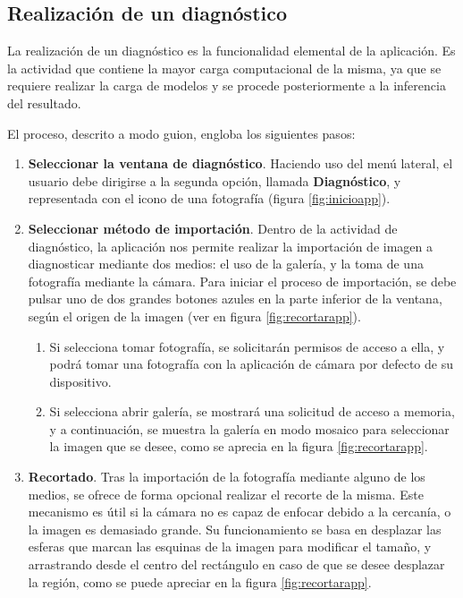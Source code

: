  \subsection{Realización de un diagnóstico}
  \label{sec:diag}
 La realización de un diagnóstico es la funcionalidad elemental de la aplicación. Es la actividad que contiene la mayor carga computacional  de la misma, ya que se requiere realizar la carga de modelos y se procede posteriormente a la inferencia del resultado.
 
 El proceso, descrito a modo guion, engloba los siguientes pasos:
 \begin{enumerate}
 	\item \textbf{Seleccionar la ventana de diagnóstico}. Haciendo uso del menú lateral, el usuario debe dirigirse a la segunda opción, llamada  \textbf{Diagnóstico}, y representada con el icono de una fotografía (figura \ref{fig:inicioapp}).
 	\item \textbf{Seleccionar método de importación}. Dentro de la actividad de diagnóstico, la aplicación nos permite realizar la importación de imagen a diagnosticar mediante dos medios: el uso de la galería, y la toma de una fotografía mediante la cámara. Para iniciar el proceso de importación, se debe pulsar uno de dos grandes botones azules en la parte inferior de la ventana, según el origen de la imagen (ver en figura \ref{fig:recortarapp}).
 	\begin{enumerate}
 		\item Si selecciona tomar fotografía, se solicitarán permisos de acceso a ella, y podrá tomar una fotografía con la aplicación de cámara por defecto de su dispositivo.
 		\item Si selecciona abrir galería, se mostrará una solicitud de acceso a memoria, y a continuación, se muestra la galería en modo mosaico para seleccionar la imagen que se desee, como se aprecia en la figura \ref{fig:recortarapp}.
 	\end{enumerate}
 	\item \textbf{Recortado}. Tras la importación de la fotografía mediante alguno de los medios, se ofrece de forma opcional realizar el recorte de la misma. Este mecanismo es útil si la cámara no es capaz de enfocar debido a la cercanía, o la imagen es demasiado grande. Su funcionamiento se basa en desplazar las esferas que marcan las esquinas de la imagen para modificar el tamaño, y arrastrando desde el centro del rectángulo en caso de que se desee desplazar la región, como se puede apreciar en la figura \ref{fig:recortarapp}.
 	

\end{enumerate}
